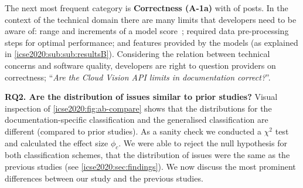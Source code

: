 The next most frequent category is \textbf{Correctness (A-1a)} with \PctTaxACorrectness{} of posts. In the context of the technical domain there are many limits that developers need to be aware of: range and increments of a model score~\citep{Cummaudo:2019va}; required data pre-processing steps for optimal performance; and features provided by the models (as explained in \cref{icse2020:sub:sub:resultsB}). Considering the relation between technical concerns and software quality, developers are right to question providers on correctness; ``\textit{Are the Cloud Vision API limits in documentation correct?}''. 

\smallskip
\noindent
\textbf{RQ2. Are the distribution of issues similar to prior studies?}
Visual inspection of \cref{icse2020:fig:ab-compare} shows that the distributions for the documentation-specific classification and the generalised classification are different (compared to prior studies). As a sanity check we conducted a $\chi^2$ test and calculated the effect size $\phi_c$. We were able to reject the null hypothesis for both classification schemes, that the distribution of issues were the same as the previous studies (see \cref{icse2020:sec:findings}). We now discuss the most prominent differences between our study and the previous studies. 



